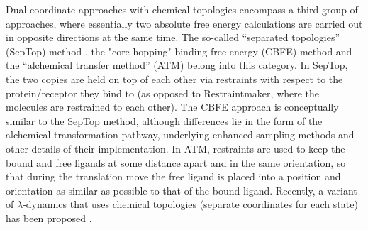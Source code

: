 \documentclass[9pt,bestpractices]{livecoms}
\begin{document}
Dual coordinate approaches with chemical topologies encompass a third group of approaches, where essentially two absolute free energy calculations are carried out in opposite directions at the same time.
The so-called ``separated topologies'' (SepTop) method \cite{rocklin2013separated,Baumann_2023}, the "core-hopping" binding free energy (CBFE) method \cite{Tsai_JChemInfModel_ASAP} and the ``alchemical transfer method'' (ATM) \cite{azimi2022relative} belong into this category. In SepTop, the two copies are held on top of each other via restraints with respect to the protein/receptor they bind to (as opposed to Restraintmaker, where the molecules are restrained to each other). %
The CBFE approach is conceptually similar to the SepTop method, although differences lie in the form of the alchemical transformation pathway\cite{Tsai_JChemTheoryComput_2023_v19_p640}, underlying enhanced sampling methods\cite{lee2023aces,Tsai_JChemInfModel_2024_v64_p7046,Zhang_JChemTheoryComput_2024_v20_p3935} and other details of their implementation. 
In ATM, restraints are used to keep the bound and free ligands at some distance apart and in the same orientation, so that during the translation move the free ligand is placed into a position and orientation as similar as possible to that of the bound ligand. Recently, a variant of $\lambda$-dynamics that uses chemical topologies (separate coordinates for each state) has been proposed \cite{Liesen_2024}.

\end{document}
